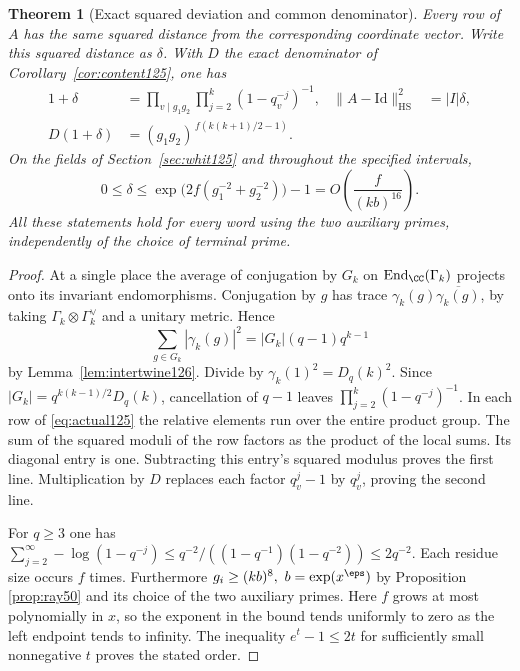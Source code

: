 \documentclass[a4paper,11pt]{article}
\newtheorem{theorem}[proposition]{Theorem}
\theoremstyle{definition}
\theoremstyle{remark}
\numberwithin{equation}{section}
\begin{document}
\begin{theorem}[Exact squared deviation and common denominator]
\label{thm:moment126}
Every row of \(A\) has the same squared distance from the
corresponding coordinate vector. Write this squared distance
as \(\delta\). With \(D\) the exact denominator of
Corollary~\ref{cor:content125}, one has
\begin{align}
 1+\delta&=\prod_{v\mid g_1g_2}\prod_{j=2}^k(1-q_v^{-j})^{-1},
 &\|A-\mathrm{Id}\|_{\mathrm{HS}}^2&=|I|\delta, \label{eq:moment126}\\
 D(1+\delta)&=(g_1g_2)^{\,f(k(k+1)/2-1)}.&& \label{eq:massden126}
\end{align}
On the fields of Section~\ref{sec:whit125} and throughout the
specified intervals,
\[
 0\le\delta\le \exp\!\big(2f(g_1^{-2}+g_2^{-2})\big)-1
             =O\!\left(\frac{f}{(kb)^{16}}\right).
\]
All these statements hold for every word using the two auxiliary
primes, independently of the choice of terminal prime.
\end{theorem}
\begin{proof}
At a single place the average of conjugation by \(G_k\) on
\(\operatorname{End}_{\CC}(\Gamma_k)\) projects onto its invariant
endomorphisms. Conjugation by \(g\) has trace
\(\gamma_k(g)\overline{\gamma_k(g)}\), by taking
\(\Gamma_k\otimes\Gamma_k^\vee\) and a unitary metric. Hence
\[
   \sum_{g\in G_k}|\gamma_k(g)|^2=|G_k|(q-1)q^{k-1}
\]
by Lemma~\ref{lem:intertwine126}. Divide by
\(\gamma_k(1)^2=D_q(k)^2\). Since
\(|G_k|=q^{k(k-1)/2}D_q(k)\), cancellation of \(q-1\)
leaves \(\prod_{j=2}^k(1-q^{-j})^{-1}\). In each row of
\eqref{eq:actual125} the relative elements run over the entire
product group. The sum of the squared moduli of the row factors
as the product of the local sums. Its diagonal entry is one.
Subtracting this entry's squared modulus proves the first line.
Multiplication by \(D\) replaces each factor \(q_v^j-1\) by \(q_v^j\),
proving the second line.

For \(q\ge3\) one has
\(\sum_{j=2}^\infty-\log(1-q^{-j})
\le q^{-2}/((1-q^{-1})(1-q^{-2}))\le2q^{-2}\).
Each residue size occurs \(f\) times. Furthermore
\(g_i\ge(kb)^8,\ b=\exp(x^\eps)\) by
Proposition \ref{prop:ray50} and its choice of the two auxiliary primes.
Here \(f\) grows at most polynomially in \(x\), so the exponent
in the bound tends uniformly to zero as the left endpoint tends
to infinity. The inequality \(e^t-1\le2t\) for sufficiently small
nonnegative \(t\) proves the stated order.
\end{proof}
\end{document}
